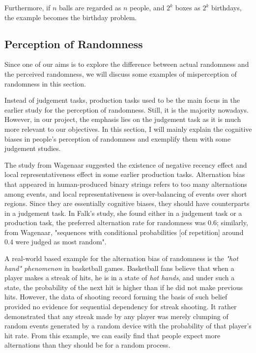 \documentclass[12pt]{article}
\theoremstyle{plain}
\theoremstyle{definition}
\theoremstyle{remark}
\begin{document}
Furthermore, if $n$ balls are regarded as $n$ people, and $2^k$ boxes as $2^k$ birthdays, the example becomes the birthday problem.\cite{1.1}

\newpage
\subsection{Perception of Randomness}
Since one of our aims is to explore the difference between actual randomness and the perceived randomness, we will discuss some examples of misperception of randomness in this section.

Instead of judgement tasks, production tasks used to be the main focus in the earlier study for the perception of randomness. Still, it is the majority nowadays. However, in our project, the emphasis lies on the judgement task as it is much more relevant to our objectives. In this section, I will mainly explain the cognitive biases in people's perception of randomness and exemplify them with some judgement studies.

The study from Wagenaar\cite[434]{1.2} suggested the existence of negative recency effect and local representativeness effect in some earlier production tasks. Alternation bias that appeared in human-produced binary strings refers to too many alternations among events, and local representativeness is over-balancing of events over short regions\cite[434]{1.2}. Since they are essentially cognitive biases, they should have counterparts in a judgement task. In Falk's study\cite[434]{1.2}, she found either in a judgement task or a production task, the preferred alternation rate for randomness was 0.6; similarly, from Wagenaar\cite[435]{1.2}, "sequences with conditional probabilities [of repetition] around 0.4 were judged as most random".

A real-world based example for the alternation bias of randomness is the \textit{"hot hand" phenomenon} in basketball games. Basketball fans believe that when a player makes a streak of hits, he is in a state of \textit{hot hands}, and under such a state, the probability of the next hit is higher than if he did not make previous hits. However, the data of shooting record\cite[437]{1.2} forming the basis of such belief provided no evidence for sequential dependency for streak shooting. It rather demonstrated that any streak made by any player was merely clumping of random events generated by a random device with the probability of that player's hit rate\cite[437]{1.2}. From this example, we can easily find that people expect more alternations than they should be for a random process.
\end{document}
